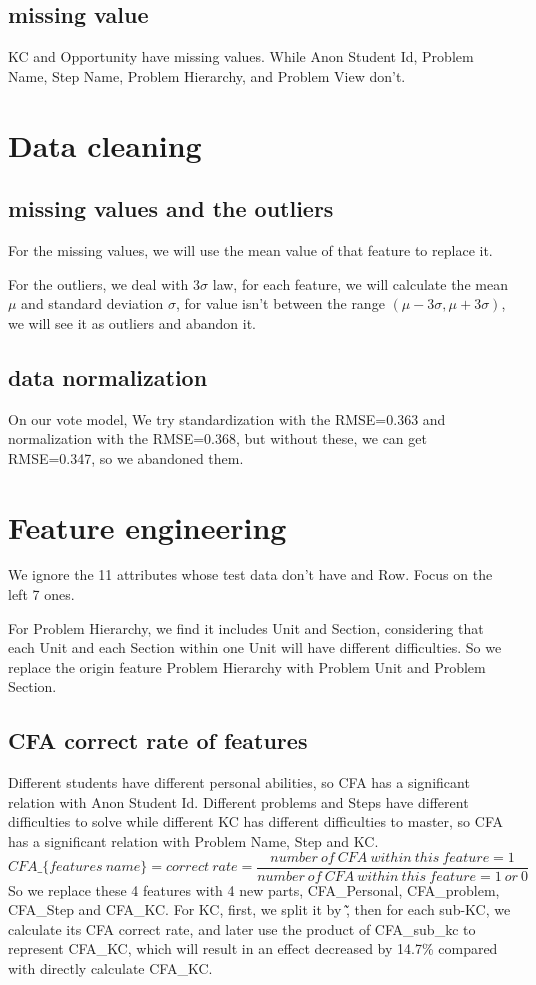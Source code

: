 \documentclass{article}
\begin{document}
	\subsection{missing value}
	KC and Opportunity have missing values. While Anon Student Id, Problem Name, Step Name, Problem Hierarchy, and Problem View don't.
	
	\section{Data cleaning}
	\subsection{missing values and the outliers}
	For the missing values, we will use the mean value of that feature to replace it.
	
	For the outliers, we deal with $3\sigma$ law, for each feature, we will calculate the mean $\mu$ and standard deviation $\sigma$, for value isn't between the range $(\mu-3\sigma,\mu+3\sigma)$, we will see it as outliers and abandon it.
	\subsection{data normalization}
	On our vote model, We try standardization with the RMSE=0.363  and normalization with the RMSE=0.368, but without these, we can get RMSE=0.347, so we abandoned them.
	\section{Feature engineering}
	
	We ignore the 11 attributes whose test data don't have and Row. Focus on the left 7 ones.
	
	For Problem Hierarchy, we find it includes Unit and Section, considering that each Unit and each Section within one Unit will have different difficulties. So we replace the origin feature  Problem Hierarchy with Problem Unit and Problem Section.
	
	\subsection{CFA correct rate of features }
	Different students have different personal abilities, so CFA has a significant relation with Anon Student Id. Different problems and Steps have different difficulties to solve while different KC has different difficulties to master, so CFA has a significant relation with Problem Name, Step and KC.
	$$CFA\_\{features\ name\}=correct\ rate=\frac{number\  of\  CFA \ within\ this\ feature=1}{number\ of\ CFA\ within \ this\ feature= 1\ or\ 0}$$
	So we replace these 4 features with 4 new parts, CFA\_Personal, CFA\_problem, CFA\_Step and CFA\_KC.
	For KC, first, we split it by \~\~, then for each sub-KC, we calculate its CFA correct rate, and later use the product of CFA\_sub\_kc to represent CFA\_{KC}, which will result in an effect decreased by 14.7\% compared with directly calculate CFA\_{KC}.
\end{document}
